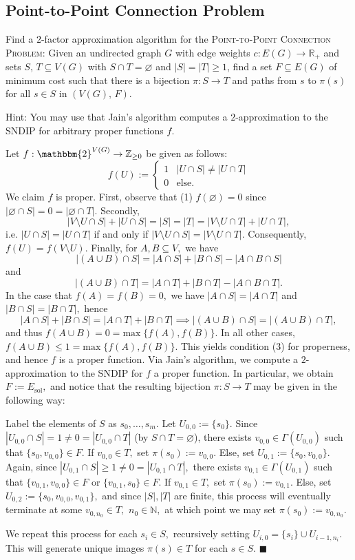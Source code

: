 \documentclass{article}
\let\emptyset\varnothing
\newcommand{\R}{\mathbb{R}}
\begin{document}
  \subsection{Point-to-Point Connection Problem}
  \begin{centerframebox}
    Find a $2$-factor approximation algorithm for the \textsc{Point-to-Point Connection Problem}:
    Given an undirected graph $G$ with edge weights $c : E(G) \to \R_+$ and sets $S,\, T \subseteq V (G)$
    with $S \cap T = \emptyset$ and $|S| = |T| \geq 1$, find a set
    $F \subseteq E(G)$ of minimum cost such that there is a bijection $\pi: S \to T$ and paths
    from $s$ to $\pi(s)$ for all $s \in S$ in $(V(G),\, F)$.

    Hint: You may use that Jain's algorithm computes a $2$-approximation to the
    SNDIP for arbitrary proper functions $f$.
  \end{centerframebox}
  Let $f:\mathbbm{2}^{V(G)}\rightarrow \mathbb{Z}_{\geq 0}$ be given as follows:
  $$f(U):=\begin{cases}
      1 & |U\cap S|\neq |U\cap T|\\
      0 & \text{else.}
  \end{cases}$$
  We claim $f$ is proper. First, observe that (1) $f(\emptyset)=0$ since $|\emptyset\cap S|=0=|\emptyset\cap T|.$ Secondly, $$|V\setminus U\cap S|+|U\cap S|=|S|=|T|=|V\setminus U\cap T|+|U\cap T|,$$i.e. $|U\cap S|=|U\cap T|$ if and only if $|V\setminus U\cap S|=|V\setminus U\cap T|.$ Consequently, $f(U)=f(V\setminus U).$ Finally, for $A,B\subseteq V,$ we have $$|(A\cup B)\cap S|=|A\cap S|+|B\cap S|-|A\cap B\cap S|$$and
  $$|(A\cup B)\cap T|=|A\cap T|+|B\cap T|-|A\cap B\cap T|.$$In the case that $f(A)=f(B)=0,$ we have $|A\cap S|=|A\cap T|$ and $|B\cap S|=|B\cap T|,$ hence $$|A\cap S|+|B\cap S|=|A\cap T|+|B\cap T|\implies |(A\cup B)\cap S|=|(A\cup B)\cap T|,$$and thus $f(A\cup B)=0=\text{max}\; \{f(A),f(B)\}.$ In all other cases, $f(A\cup B)\leq 1=\text{max}\; \{f(A),f(B)\}.$ This yields condition (3) for properness, and hence $f$ is a proper function. Via Jain's algorithm, we compute a $2$-approximation to the SNDIP for $f$ a proper function. In particular, we obtain $F:=E_{\text{sol}},$ and notice that the resulting bijection $\pi:S\rightarrow T$ may be given in the following way:

  Label the elements of $S$ as $s_0,\dots, s_m.$ Let $U_{0,0}:=\{s_0\}.$ Since $|U_{0,0}\cap S|=1\neq 0=|U_{0,0}\cap T|$ (by $S\cap T=\emptyset$), there exists $v_{0,0}\in \Gamma(U_{0,0})$ such that $\{s_0,v_{0,0}\}\in F.$ If $v_{0,0}\in T,$ set $\pi(s_0):=v_{0,0}.$ Else, set $U_{0,1}:=\{s_0,v_{0,0}\}.$ Again, since $|U_{0,1}\cap S|\geq 1\neq 0=|U_{0,1}\cap T|,$ there exists $v_{0,1}\in \Gamma(U_{0,1})$ such that $\{v_{0,1},v_{0,0}\}\in F$ or $\{v_{0,1},s_0\}\in F.$ If $v_{0,1}\in T,$ set $\pi(s_0):=v_{0,1}.$ Else, set $U_{0,2}:=\{s_0,v_{0,0},v_{0,1}\},$ and since $|S|,|T|$ are finite, this process will eventually terminate at some $v_{0,n_0}\in T,$ $n_0\in \mathbb{N},$ at which point we may set $\pi(s_0):=v_{0,n_0}.$

  We repeat this process for each $s_i\in S,$ recursively setting $U_{i,0}=\{s_i\}\cup U_{i-1,n_i}.$ This will generate unique images $\pi(s)\in T$ for each $s\in S.$ $\blacksquare$
\end{document}
